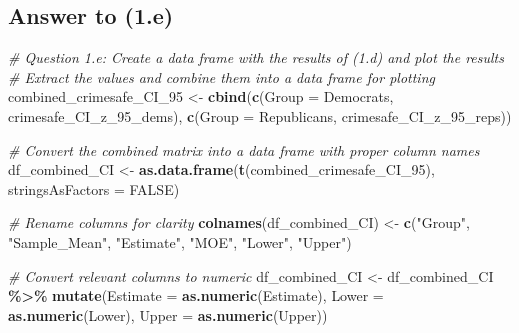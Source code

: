 \documentclass[
  11pt,
]{article}
\newenvironment{Shaded}{\begin{snugshade}}{\end{snugshade}}
\newcommand{\AttributeTok}[1]{\textcolor[rgb]{0.13,0.29,0.53}{#1}}
\newcommand{\CommentTok}[1]{\textcolor[rgb]{0.56,0.35,0.01}{\textit{#1}}}
\newcommand{\ConstantTok}[1]{\textcolor[rgb]{0.56,0.35,0.01}{#1}}
\newcommand{\FunctionTok}[1]{\textcolor[rgb]{0.13,0.29,0.53}{\textbf{#1}}}
\newcommand{\NormalTok}[1]{#1}
\newcommand{\OtherTok}[1]{\textcolor[rgb]{0.56,0.35,0.01}{#1}}
\newcommand{\SpecialCharTok}[1]{\textcolor[rgb]{0.81,0.36,0.00}{\textbf{#1}}}
\newcommand{\StringTok}[1]{\textcolor[rgb]{0.31,0.60,0.02}{#1}}
\begin{document}
\subsection{Answer to (1.e)}\label{answer-to-1.e}

\begin{Shaded}
\begin{Highlighting}[]
\CommentTok{\# Question 1.e: Create a data frame with the results of (1.d) and plot the results}
\CommentTok{\# Extract the values and combine them into a data frame for plotting}
\NormalTok{combined\_crimesafe\_CI\_95 }\OtherTok{\textless{}{-}} \FunctionTok{cbind}\NormalTok{(}\FunctionTok{c}\NormalTok{(}\AttributeTok{Group =} \StringTok{\textquotesingle{}Democrats\textquotesingle{}}\NormalTok{, crimesafe\_CI\_z\_95\_dems),}
                                  \FunctionTok{c}\NormalTok{(}\AttributeTok{Group =} \StringTok{\textquotesingle{}Republicans\textquotesingle{}}\NormalTok{, crimesafe\_CI\_z\_95\_reps))}

\CommentTok{\# Convert the combined matrix into a data frame with proper column names}
\NormalTok{df\_combined\_CI }\OtherTok{\textless{}{-}} \FunctionTok{as.data.frame}\NormalTok{(}\FunctionTok{t}\NormalTok{(combined\_crimesafe\_CI\_95), }\AttributeTok{stringsAsFactors =} \ConstantTok{FALSE}\NormalTok{)}

\CommentTok{\# Rename columns for clarity}
\FunctionTok{colnames}\NormalTok{(df\_combined\_CI) }\OtherTok{\textless{}{-}} \FunctionTok{c}\NormalTok{(}\StringTok{"Group"}\NormalTok{, }\StringTok{"Sample\_Mean"}\NormalTok{, }\StringTok{"Estimate"}\NormalTok{, }\StringTok{"MOE"}\NormalTok{, }\StringTok{"Lower"}\NormalTok{, }\StringTok{"Upper"}\NormalTok{)}

\CommentTok{\# Convert relevant columns to numeric}
\NormalTok{df\_combined\_CI }\OtherTok{\textless{}{-}}\NormalTok{ df\_combined\_CI }\SpecialCharTok{\%\textgreater{}\%}
  \FunctionTok{mutate}\NormalTok{(}\AttributeTok{Estimate =} \FunctionTok{as.numeric}\NormalTok{(Estimate),}
         \AttributeTok{Lower =} \FunctionTok{as.numeric}\NormalTok{(Lower),}
         \AttributeTok{Upper =} \FunctionTok{as.numeric}\NormalTok{(Upper))}


\end{Highlighting}
\end{Shaded}
\end{document}
